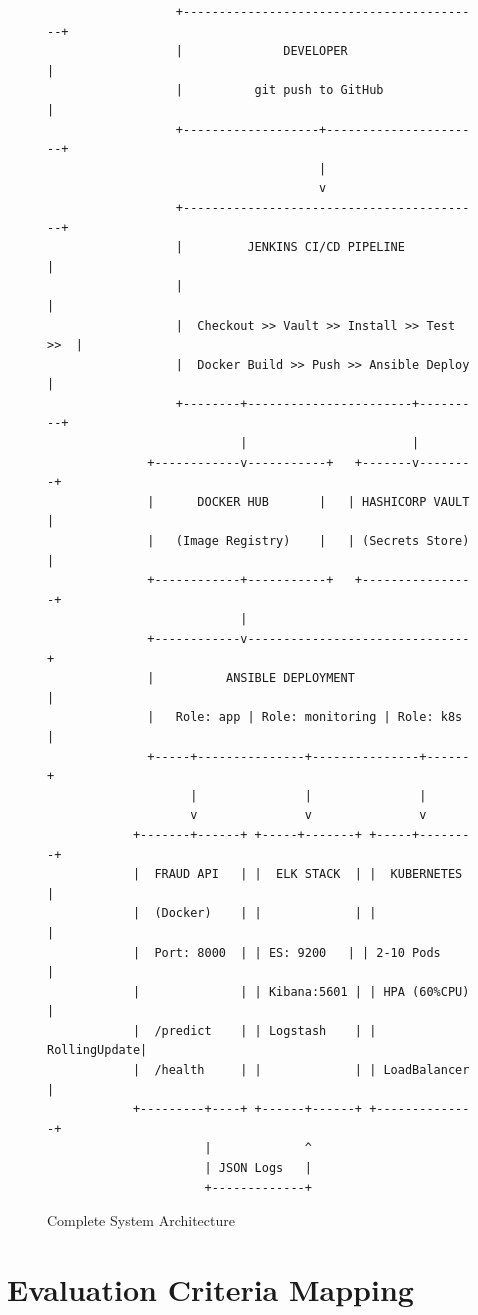 \documentclass[12pt,a4paper]{article}
\begin{document}
\begin{figure}[H]
\centering
\begin{verbatim}
                  +------------------------------------------+
                  |              DEVELOPER                    |
                  |          git push to GitHub               |
                  +-------------------+----------------------+
                                      |
                                      v
                  +------------------------------------------+
                  |         JENKINS CI/CD PIPELINE            |
                  |                                          |
                  |  Checkout >> Vault >> Install >> Test >>  |
                  |  Docker Build >> Push >> Ansible Deploy   |
                  +--------+-----------------------+---------+
                           |                       |
              +------------v-----------+   +-------v--------+
              |      DOCKER HUB       |   | HASHICORP VAULT |
              |   (Image Registry)    |   | (Secrets Store) |
              +------------+-----------+   +----------------+
                           |
              +------------v-------------------------------+
              |          ANSIBLE DEPLOYMENT                 |
              |   Role: app | Role: monitoring | Role: k8s |
              +-----+---------------+---------------+------+
                    |               |               |
                    v               v               v
            +-------+------+ +-----+-------+ +-----+--------+
            |  FRAUD API   | |  ELK STACK  | |  KUBERNETES  |
            |  (Docker)    | |             | |              |
            |  Port: 8000  | | ES: 9200   | | 2-10 Pods    |
            |              | | Kibana:5601 | | HPA (60%CPU) |
            |  /predict    | | Logstash    | | RollingUpdate|
            |  /health     | |             | | LoadBalancer |
            +---------+----+ +------+------+ +--------------+
                      |             ^
                      | JSON Logs   |
                      +-------------+
\end{verbatim}
\caption{Complete System Architecture}
\end{figure}

\section{Evaluation Criteria Mapping}
\end{document}
